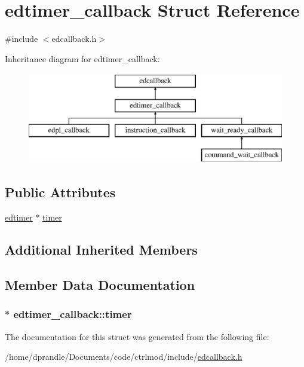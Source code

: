 \hypertarget{structedtimer__callback}{\section{edtimer\-\_\-callback Struct Reference}
\label{structedtimer__callback}
}


{\ttfamily \#include $<$edcallback.\-h$>$}

Inheritance diagram for edtimer\-\_\-callback\-:\begin{figure}[H]
\begin{center}
\leavevmode
\includegraphics[height=4.000000cm]{structedtimer__callback}
\end{center}
\end{figure}
\subsection*{Public Attributes}
\begin{DoxyCompactItemize}
\item 
\hyperlink{classedtimer}{edtimer} $\ast$ \hyperlink{structedtimer__callback_a699081d4750918572f50de368e5c4536}{timer}
\end{DoxyCompactItemize}
\subsection*{Additional Inherited Members}


\subsection{Member Data Documentation}
\hypertarget{structedtimer__callback_a699081d4750918572f50de368e5c4536}{
\subsubsection[{timer}]{$\ast$ edtimer\-\_\-callback\-::timer}}\label{structedtimer__callback_a699081d4750918572f50de368e5c4536}


The documentation for this struct was generated from the following file\-:\begin{DoxyCompactItemize}
\item 
/home/dprandle/\-Documents/code/ctrlmod/include/\hyperlink{edcallback_8h}{edcallback.\-h}\end{DoxyCompactItemize}
